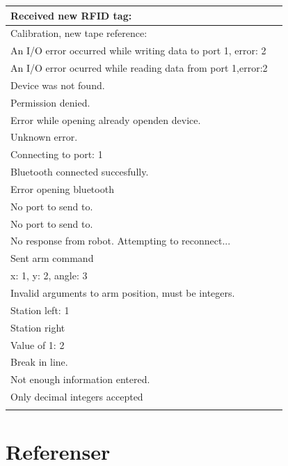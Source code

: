 \documentclass[a4paper,12pt]{article}
\begin{document}
\begin{longtable}{|p{}|p{}|}
        Received new RFID tag:  & \\ \hline
        Calibration, new tape reference:  & \\ \hline
        An I/O error occurred while writing data to port 1, error: 2 & \\ \hline
        An I/O error ocurred while reading data from port 1,error:2 & \\ \hline
        Device was not found. & \\ \hline
        Permission denied. & \\ \hline
        Error while opening already openden device. & \\ \hline
        Unknown error. & \\ \hline
        Connecting to port: 1 & \\ \hline
        Bluetooth connected succesfully. & \\ \hline
        Error opening bluetooth & \\ \hline
        No port to send to. & \\ \hline
        No port to send to. & \\ \hline
        No response from robot. Attempting to reconnect... & \\ \hline
        Sent arm command & \\ \hline
        x: 1, y: 2, angle: 3 & \\ \hline
        Invalid arguments to arm position, must be integers. & \\ \hline
        Station left: 1 & \\ \hline
        Station right & \\ \hline
        Value of 1: 2 & \\ \hline
        Break in line. & \\ \hline
        Not enough information entered. & \\ \hline
        Only decimal integers accepted & \\ \hline
\label{tab:logg}
\end{longtable}


\newpage
\section*{Referenser}


\newpage
\appendix
\end{document}
